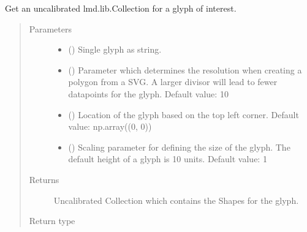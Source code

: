 \documentclass[letterpaper,10pt,english,openany,oneside]{sphinxmanual}
\begin{document}
\begin{fulllineitems}
\label{\detokenize{pages/modules:lmd.tools.glyph}}
\sphinxAtStartPar
Get an uncalibrated lmd.lib.Collection for a glyph of interest.
\begin{quote}\begin{description}
\item[{Parameters}] \leavevmode\begin{itemize}
\item {} 
\sphinxAtStartPar
{} () \textendash{} Single glyph as string.

\item {} 
\sphinxAtStartPar
{} () \textendash{} Parameter which determines the resolution when creating a polygon from a SVG. A larger divisor will lead to fewer datapoints for the glyph. Default value: 10

\item {} 
\sphinxAtStartPar
{} () \textendash{} Location of the glyph based on the top left corner. Default value: np.array((0, 0))

\item {} 
\sphinxAtStartPar
{} () \textendash{} Scaling parameter for defining the size of the glyph. The default height of a glyph is 10 units. Default value: 1

\end{itemize}

\item[{Returns}] \leavevmode
\sphinxAtStartPar
Uncalibrated Collection which contains the Shapes for the glyph.

\item[{Return type}] \leavevmode
\sphinxAtStartPar
{\hyperref[\detokenize{pages/modules:lmd.lib.Collection}]{}}

\end{description}\end{quote}

\end{fulllineitems}
\end{document}
